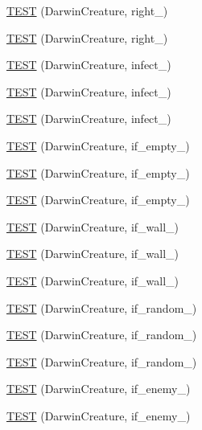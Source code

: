\begin{DoxyCompactItemize}
\item 
\hyperlink{TestDarwin_8c_09_09_ab25b369279ed97be22e0f8631f18b70e}{T\-E\-S\-T} (Darwin\-Creature, right\-\_)
\item 
\hyperlink{TestDarwin_8c_09_09_a3df4c19f411e61fb0597f0299b9b457a}{T\-E\-S\-T} (Darwin\-Creature, right\-\_)
\item 
\hyperlink{TestDarwin_8c_09_09_a2b8e4d3d59a94f8cd9aabfd937d28146}{T\-E\-S\-T} (Darwin\-Creature, infect\-\_)
\item 
\hyperlink{TestDarwin_8c_09_09_af0fc398abd461f71eca6c17dfe611606}{T\-E\-S\-T} (Darwin\-Creature, infect\-\_)
\item 
\hyperlink{TestDarwin_8c_09_09_a324a2486104c826157faf6141b36aeb0}{T\-E\-S\-T} (Darwin\-Creature, infect\-\_)
\item 
\hyperlink{TestDarwin_8c_09_09_a9c7b01c6700b3a36ee67c0757b69afe3}{T\-E\-S\-T} (Darwin\-Creature, if\-\_\-empty\-\_)
\item 
\hyperlink{TestDarwin_8c_09_09_a8cf0d16d4d25b3fa794bc35a806bfe1a}{T\-E\-S\-T} (Darwin\-Creature, if\-\_\-empty\-\_)
\item 
\hyperlink{TestDarwin_8c_09_09_a6b6a0d446ff2dab7bc0b57e69d8a6ceb}{T\-E\-S\-T} (Darwin\-Creature, if\-\_\-empty\-\_)
\item 
\hyperlink{TestDarwin_8c_09_09_a508abc57f1a3dc122ad7c2aa1ff0fb83}{T\-E\-S\-T} (Darwin\-Creature, if\-\_\-wall\-\_)
\item 
\hyperlink{TestDarwin_8c_09_09_a01fad6540041699285984e1062429c4b}{T\-E\-S\-T} (Darwin\-Creature, if\-\_\-wall\-\_)
\item 
\hyperlink{TestDarwin_8c_09_09_a18d223ed9b0141fc9ff0ea9e59513552}{T\-E\-S\-T} (Darwin\-Creature, if\-\_\-wall\-\_)
\item 
\hyperlink{TestDarwin_8c_09_09_a7bc5b1badb926b8c3bca0f15cab77020}{T\-E\-S\-T} (Darwin\-Creature, if\-\_\-random\-\_)
\item 
\hyperlink{TestDarwin_8c_09_09_ae396e6d5929911b048ecdbe57470096c}{T\-E\-S\-T} (Darwin\-Creature, if\-\_\-random\-\_)
\item 
\hyperlink{TestDarwin_8c_09_09_a3060a65d8b855638b85469093e6907de}{T\-E\-S\-T} (Darwin\-Creature, if\-\_\-random\-\_)
\item 
\hyperlink{TestDarwin_8c_09_09_ae7d9b8d96457f2c5bfb65a91951b7311}{T\-E\-S\-T} (Darwin\-Creature, if\-\_\-enemy\-\_)
\item 
\hyperlink{TestDarwin_8c_09_09_a56e84332af60d52b78469f2c5b19c01d}{T\-E\-S\-T} (Darwin\-Creature, if\-\_\-enemy\-\_)

\end{DoxyCompactItemize}
